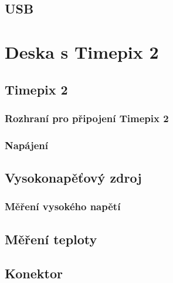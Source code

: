	\subsection{USB} %
	\label{USB}

\section{Deska s Timepix 2}
	\subsection{Timepix 2}	%
		\subsubsection{Rozhraní pro připojení Timepix 2}	%
		\subsubsection{Napájení}	%
	\subsection{Vysokonapěťový zdroj}	%
		\subsubsection{Měření vysokého napětí} %
	\subsection{Měření teploty}	%
	\label{Mereni teploty}
	\subsection{Konektor}	%
	\label{konektor}
